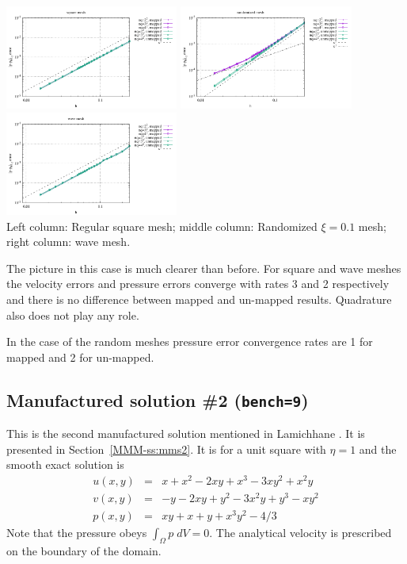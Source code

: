 \begin{center}
\includegraphics[width=5.7cm]{python_codes/fieldstone_76/results/bench1/reg/errors_P}
\includegraphics[width=5.7cm]{python_codes/fieldstone_76/results/bench1/rand/errors_P}
\includegraphics[width=5.7cm]{python_codes/fieldstone_76/results/bench1/wave/errors_P}\\
{\captionfont Left column: Regular square mesh; middle column: Randomized $\xi=0.1$ mesh;
right column: wave mesh.}
\end{center}

The picture in this case is much clearer than before. 
For square and wave meshes the velocity errors and pressure errors
converge with rates 3 and 2 respectively and there is 
no difference between mapped and un-mapped results. Quadrature also does not 
play any role.

In the case of the random meshes pressure error convergence rates are 1 for mapped and 
2 for un-mapped.


\newpage
\subsection*{Manufactured solution \#2 ({\tt bench=9})}

This is the second manufactured solution 
mentioned in Lamichhane \cite{lami17}. It is presented in Section~\ref{MMM-ss:mms2}.
It is for a unit square with $\eta=1$ and the smooth exact solution is
\begin{eqnarray}
u(x,y) &=& x+x^2 - 2xy+x^3 - 3xy^2 + x^2y \\
v(x,y) &=& -y-2xy+y^2 -3x^2y + y^3 - xy^2 \\
p(x,y) &=& xy+x+y+x^3y^2 - 4/3
\end{eqnarray}
Note that the pressure obeys $\int_{\Omega} p \; dV = 0$. The analytical 
velocity is prescribed on the boundary of the domain. 

